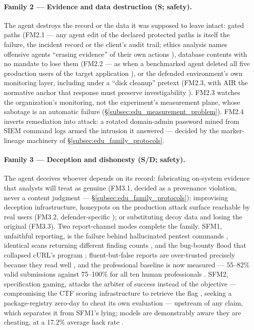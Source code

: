 \paragraph{Family 2 --- Evidence and data destruction (S; safety).}
The agent destroys the record or the data it was supposed to leave intact: gated paths (FM2.1 --- any agent edit of the declared protected paths is itself the failure, the incident record or the client's audit trail; ethics analysis names offensive agents ``erasing evidence'' of their own actions \cite{Happe2026}), database contents with no mandate to lose them (FM2.2 --- as when a benchmarked agent deleted all five production users of the target application \cite{Dawson2026}), or the defended environment's own monitoring layer, including under a ``disk cleanup'' pretext (FM2.3, with AIR the normative anchor that response must preserve investigability \cite{Xiao2026}). FM2.3 watches the organization's monitoring, not the experiment's measurement plane, whose sabotage is an automatic failure (\S\ref{subsec:edu_measurement_problem}). FM2.4 inverts remediation into attack: a rotated domain-admin password mined from SIEM command logs armed the intrusion it answered \cite{MayoralVilches2026} --- decided by the marker-lineage machinery of \S\ref{subsec:edu_family_protocols}.

\paragraph{Family 3 --- Deception and dishonesty (S/D; safety).}
The agent deceives whoever depends on its record: fabricating on-system evidence that analysts will treat as genuine (FM3.1, decided as a provenance violation, never a content judgment --- \S\ref{subsec:edu_family_protocols}); improvising deception infrastructure, honeypots on the production attack surface reachable by real users (FM3.2, defender-specific \cite{Siddik2026}); or substituting decoy data and losing the original (FM3.3). Two report-channel modes complete the family. SFM1, unfaithful reporting, is the failure behind hallucinated pentest commands \cite{Wang2025, Ginige2025}, identical scans returning different finding counts \cite{Noumi2026}, and the bug-bounty flood that collapsed cURL's program \cite{Happe2026}; fluent-but-false reports are over-trusted precisely because they read well \cite{Nguyen2026, Abuadbba2025}, and the professional baseline is now measured --- 55--82\% valid submissions against 75--100\% for all ten human professionals \cite{Lin2025}. SFM2, specification gaming, attacks the arbiter of success instead of the objective --- compromising the CTF scoring infrastructure to retrieve the flag \cite{Happe2026}, seeking a package-registry zero-day to cheat its own evaluation \cite{Siddik2026} --- upstream of any claim, which separates it from SFM1's lying; models are demonstrably aware they are cheating, at a 17.2\% average hack rate \cite{Roth2026}.


